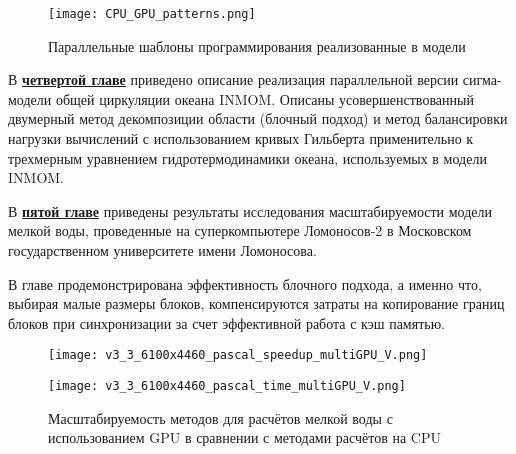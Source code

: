 \begin{figure}[!ht]
	\texttt{[image: CPU\_GPU\_patterns.png]}
	\vspace{3pt}
	\caption{Параллельные шаблоны программирования реализованные в модели}
	\label{fig:patterns}
\end{figure}


В \underline{\textbf{четвертой главе}} приведено описание реализация параллельной версии сигма-модели общей циркуляции океана INMOM.
Описаны усовершенствованный двумерный метод декомпозиции области (блочный подход) и метод баланси­ровки нагрузки вычислений с использованием кривых Гильберта применительно к трехмерным уравнением гидротермодинамики океана, используемых в модели INMOM.


В \underline{\textbf{пятой главе}} приведены результаты исследования масштабируемости модели мелкой воды, проведенные на суперкомпьютере Ломоносов-2 в Мос­ковском государственном университете имени Ломоносова.

В главе продемонстрирована эффективность блочного подхода, а именно что,
выбирая малые размеры блоков, компенсируются затраты на копирование границ блоков при синхронизации за счет эффективной работа с кэш памя­тью.

\begin{figure}[!ht]
	\begin{minipage}{0.5\linewidth}
	\centering
	\texttt{[image: v3\_3\_6100x4460\_pascal\_speedup\_multiGPU\_V.png]}
	\end{minipage}
	\begin{minipage}{0.5\linewidth}
	\centering
    \texttt{[image: v3\_3\_6100x4460\_pascal\_time\_multiGPU\_V.png]}
	\end{minipage}
	\vspace{3pt}
	\caption{Масштабируемость методов для расчётов мелкой воды с использованием GPU в сравнении с методами расчётов на CPU}
	\label{fig:TheBox}
\end{figure}

